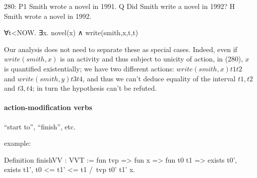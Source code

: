 \documentclass[a4paper,11pt]{article}
\begin{document}
280:
P1	Smith wrote a novel in 1991.
Q 	Did Smith write a novel in 1992?
H 	Smith wrote a novel in 1992.

∀t<NOW. ∃x. novel(x) ∧ write(smith,x,t,t)

Our analysis does not need to separate these as special cases. Indeed,
even if $write(smith,x)$ is an activity and thus subject to unicity of
action, in (280), $x$ is quantified existentially; we have two
different actions: $write(smith,x) t1 t2$ and $write(smith,y) t3 t4$,
and thus we can't deduce equality of the interval $t1,t2$ and $t3,t4$;
in turn the hypothesis can't be refuted.


\paragraph{action-modification verbs}

``start to'', ``finish'', etc.

example:

Definition finishVV : VVT := fun tvp => fun x => fun t0 t1 =>
exists t0', exists t1', t0 <= t1' <= t1 /\ tvp t0' t1' x.
\end{document}
